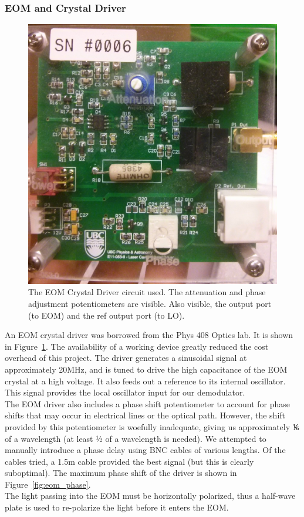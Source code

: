     \subsubsection{EOM and Crystal Driver}
    
\begin{figure}
  \includegraphics[width=.5\textwidth]{figures/eom_driver.jpg}
  \centering\caption{The EOM Crystal Driver circuit used.  The attenuation and phase adjustment potentiometers are visible.  Also visible, the output port (to EOM) and the ref output port (to LO).}
  \label{eom_driver}
\end{figure}

An EOM crystal driver was borrowed from the Phys 408 Optics lab.  It is shown in Figure~\ref{eom_driver}.  The availability of a working device greatly reduced the cost overhead of this project.  The driver generates a sinusoidal signal at approximately 20MHz, and is tuned to drive the high capacitance of the EOM crystal at a high voltage.  It also feeds out a reference to its internal oscillator.  This signal provides the local oscillator input for our demodulator. \\

The EOM driver also includes a phase shift potentiometer to account for phase shifts that may occur in electrical lines or the optical path.  However, the shift provided by this potentiometer is woefully inadequate, giving us approximately ⅙ of a wavelength (at least ½ of a wavelength is needed).  We attempted to manually introduce a phase delay using BNC cables of various lengths.  Of the cables tried, a 1.5m cable provided the best signal (but this is clearly suboptimal).  The maximum phase shift of the driver is shown in Figure~\ref{fig:eom_phase}. \\

The light passing into the EOM must be horizontally polarized, thus a half-wave plate is used to re-polarize the light before it enters the EOM. \\


